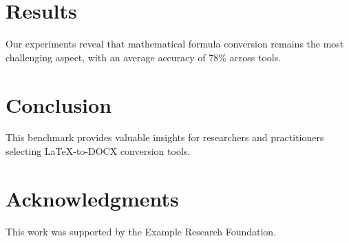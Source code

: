 \documentclass[sigconf,anonymous,review]{acmart}
\begin{document}
\section{Results}

Our experiments reveal that mathematical formula conversion remains the most
challenging aspect, with an average accuracy of 78\% across tools.

\section{Conclusion}

This benchmark provides valuable insights for researchers and practitioners
selecting LaTeX-to-DOCX conversion tools.

\section{Acknowledgments}

This work was supported by the Example Research Foundation.



\end{document}
